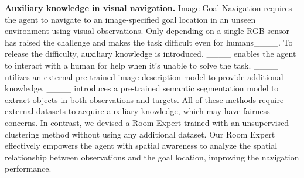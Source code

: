 \noindent\textbf{Auxiliary knowledge in visual navigation.} Image-Goal Navigation requires the agent to navigate to an image-specified goal location in an unseen environment using visual observations. Only depending on a single RGB sensor has raised the challenge and makes the task difficult even for humans____. To release the difficulty, auxiliary knowledge is introduced. ____ enables the agent to interact with a human for help when it's unable to solve the task. ____ utilizes an external pre-trained image description model to provide additional knowledge. ____ introduces a pre-trained semantic segmentation model to extract objects in both observations and targets. All of these methods require external datasets to acquire auxiliary knowledge, which may have fairness concerns. In contrast, we devised a Room Expert trained with an unsupervised clustering method without using any additional dataset. Our Room Expert effectively empowers the agent with spatial awareness to analyze the spatial relationship between observations and the goal location, improving the navigation performance.
